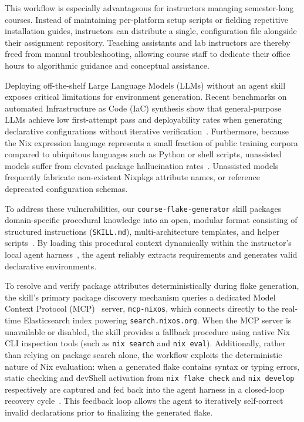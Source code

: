This workflow is especially advantageous for instructors managing semester-long
courses. Instead of maintaining per-platform setup scripts or fielding repetitive
installation guides, instructors can distribute a single, configuration file alongside
their assignment repository. Teaching assistants and lab instructors are thereby
freed from manual troubleshooting, allowing course staff to dedicate their office
hours to algorithmic guidance and conceptual assistance.

Deploying off-the-shelf Large Language Models (LLMs) without an agent skill exposes
critical limitations for environment generation. Recent benchmarks on automated
Infrastructure as Code (IaC) synthesis show that general-purpose LLMs achieve
low first-attempt pass and deployability rates when generating declarative
configurations without iterative verification~\cite{konIaCEvalCodeGeneration,zhangDeployabilityCentricInfrastructureasCodeGeneration2025}.
Furthermore, because the Nix expression language represents a small fraction of
public training corpora compared to ubiquitous languages such as Python or shell
scripts, unassisted models suffer from elevated package hallucination rates~\cite{ImportingPhantomsMeasuring,srivatsaSurveyUsingLarge}.
Unassisted models frequently fabricate non-existent Nixpkgs attribute names, or reference
deprecated configuration schemas.

To address these vulnerabilities, our \texttt{course-flake-generator} skill packages
domain-specific procedural knowledge into an open, modular format consisting of
structured instructions (\texttt{SKILL.md}), multi-architecture templates, and helper
scripts~\cite{AgentSkills,lingAgentSkillsDataDriven2026}. By loading this
procedural context dynamically within the instructor's local agent harness~\cite{mengAgentHarnessLarge2026,lingAgentSkillsDataDriven2026},
the agent reliably extracts requirements and generates valid declarative environments.

To resolve and verify package attributes deterministically during flake generation,
the skill's primary package discovery mechanism queries a dedicated Model
Context Protocol (MCP)~\cite{MCPLandscape} server, \texttt{mcp-nixos}, which connects
directly to the real-time Elasticsearch index powering \texttt{search.nixos.org}.
When the MCP server is unavailable or disabled, the skill provides a fallback
procedure using native Nix CLI inspection tools (such as \texttt{nix search} and
\texttt{nix eval}). Additionally, rather than relying on package search alone, the
workflow exploits the deterministic nature of Nix evaluation: when a generated
flake contains syntax or typing errors, static checking and devShell activation from
\texttt{nix flake check} and \texttt{nix develop} respectively are captured and fed
back into the agent harness in a closed-loop recovery cycle~\cite{zhangDeployabilityCentricInfrastructureasCodeGeneration2025,mengAgentHarnessLarge2026}.
This feedback loop allows the agent to iteratively self-correct invalid
declarations prior to finalizing the generated flake.

